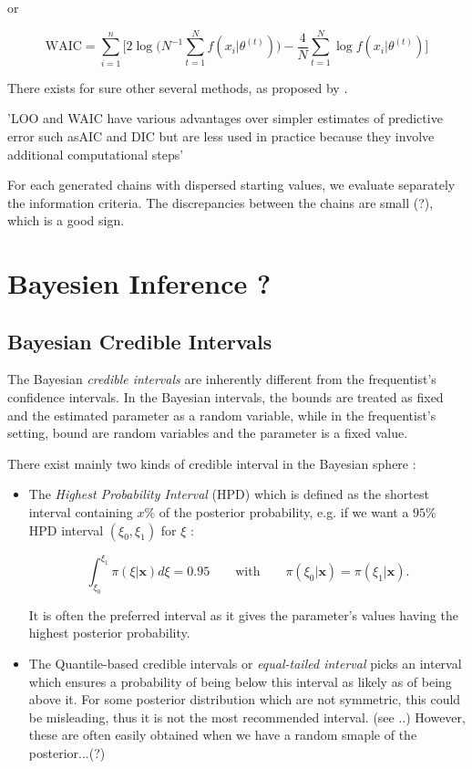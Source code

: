 or 

\begin{equation}
\text{WAIC} = \sum_{i=1}^n\Bigg[2\log \bigg(N^{-1}\sum_{t=1}^N f(x_i|\theta^{(t)})\bigg)-\frac{4}{N}\sum_{t=1}^N\log f(x_i|\theta^{(t)})\Bigg]
\end{equation}



There exists for sure other several methods, as proposed by \citet{gelman_understanding_2014}.
 
 'LOO and WAIC have various advantages over simpler estimates of predictive error such asAIC and DIC but are less used in practice because they involve additional computational steps' 


For each generated chains with dispersed starting values, we evaluate separately the information criteria. The discrepancies between the chains are small (?), which is a good sign. 

\section{Bayesien Inference ?}

\subsection{Bayesian Credible Intervals}\label{bayes_cred_int}

The Bayesian \emph{credible intervals} are inherently different from the frequentist's confidence intervals. In the Bayesian intervals, the bounds are treated as fixed and the estimated parameter as a random variable, while in the frequentist's setting, bound are random variables and the parameter is a fixed value.

There exist mainly two kinds of credible interval in the Bayesian sphere : 

\begin{itemize}
	\item The \emph{Highest Probability Interval} (HPD) which is defined as the shortest interval containing $x\%$ of the posterior probability, e.g. if we want a $95\%$ HPD interval $(\xi_0,\xi_1)$ for $\xi$ :
	
	\begin{equation} 
	\int_{\xi_0}^{\xi_1}\pi(\xi|\boldsymbol{x})d\xi=0.95 \qquad\text{with}\qquad \pi(\xi_0|\boldsymbol{x})=\pi(\xi_1|\boldsymbol{x}).
	\end{equation}
	
	It is often the preferred interval as it gives the parameter's values having the highest posterior probability. 
	\item The Quantile-based credible intervals or \emph{equal-tailed interval} picks an interval which ensures a probability of being below this interval as likely as of being above it. 
	For some posterior distribution which are not symmetric, this could be misleading, thus it is not the most recommended interval. (see ..)
	However, these are often easily obtained when we have a random smaple of the posterior...(?)
\end{itemize}


